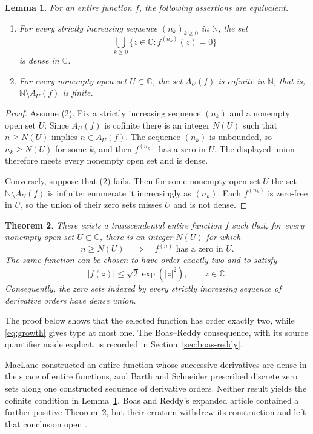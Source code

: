 \documentclass[plain]{baustms}
\newcommand{\C}{\mathbb C}
\newcommand{\N}{\mathbb N}
\theoremstyle{cupthm}
\newtheorem{theorem}{Theorem}[section]
\newtheorem{lemma}[theorem]{Lemma}
\begin{document}
\begin{lemma}\label{lem:cofinite}
For an entire function $f$, the following assertions are equivalent.
\begin{enumerate}[\rm(1)]
\item For every strictly increasing sequence $(n_k)_{k\geq0}$ in $\N$, the set
\[
 \bigcup_{k\geq0}\{z\in\C:f^{(n_k)}(z)=0\}
\]
is dense in $\C$.
\item For every nonempty open set $U\subset\C$, the set $A_U(f)$ is cofinite
in $\N$, that is, $\N\setminus A_U(f)$ is finite.
\end{enumerate}
\end{lemma}

\begin{proof}
Assume (2). Fix a strictly increasing sequence $(n_k)$ and a nonempty open
set $U$. Since $A_U(f)$ is cofinite there is an integer $N(U)$ such that
$n\geq N(U)$ implies $n\in A_U(f)$. The sequence $(n_k)$ is unbounded, so
$n_k\geq N(U)$ for some $k$, and then $f^{(n_k)}$ has a zero in $U$. The
displayed union therefore meets every nonempty open set and is dense.

Conversely, suppose that (2) fails. Then for some nonempty open set $U$ the
set $\N\setminus A_U(f)$ is infinite; enumerate it increasingly as $(n_k)$.
Each $f^{(n_k)}$ is zero-free in $U$, so the union of their zero sets misses
$U$ and is not dense.
\end{proof}

\begin{theorem}\label{thm:main}
There exists a transcendental entire function $f$ such that, for every
nonempty open set $U\subset\C$, there is an integer $N(U)$ for which
\[
 n\geq N(U)\quad\Longrightarrow\quad f^{(n)}\text{ has a zero in }U.
\]
The same function can be chosen to have order exactly two and to satisfy
\begin{equation}\label{eq:growth}
 |f(z)|\leq\sqrt2\exp(|z|^2),\qquad z\in\C.
\end{equation}
Consequently, the zero sets indexed by every strictly increasing sequence of
derivative orders have dense union.
\end{theorem}

The proof below shows that the selected function has order exactly two, while
\eqref{eq:growth} gives type at most one. The Boas--Reddy consequence, with
its source quantifier made explicit, is recorded in
Section~\ref{sec:boas-reddy}.

MacLane \cite{MacLane1952} constructed an entire function whose successive
derivatives are dense in the space of entire functions, and Barth and
Schneider \cite{BarthSchneider1972} prescribed discrete zero sets along one
constructed sequence of derivative orders. Neither result yields the
cofinite condition in Lemma~\ref{lem:cofinite}. Boas and Reddy's expanded
article \cite{BoasReddyJMAA1973} contained a further positive Theorem~2, but
their erratum withdrew its construction and left that conclusion open
\cite{BoasReddy1975}.
\end{document}
